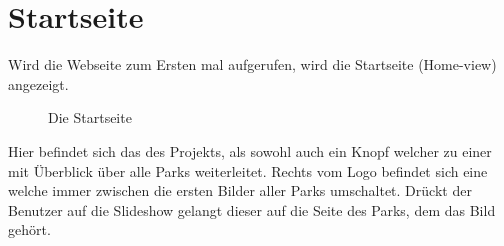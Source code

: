 \section{Startseite}
\label{home}

Wird die Webseite zum Ersten mal aufgerufen, wird die Startseite (Home-view) angezeigt. 

\begin{figure}[H]
    \begin{center}
      \caption{Die Startseite}
    \end{center}
\end{figure}

Hier befindet sich das \underline{} des Projekts, als sowohl auch ein Knopf welcher zu einer \underline{} mit Überblick über alle 
Parks weiterleitet. Rechts vom Logo befindet sich eine \underline{} welche immer zwischen die ersten Bilder 
aller Parks umschaltet. Drückt der Benutzer auf die Slideshow gelangt dieser auf die \underline{}
Seite des Parks, dem das Bild gehört. 
